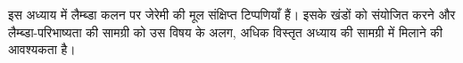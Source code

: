 \documentclass[../../../include/open-logic-chapter]{subfiles}
\begin{document}

\begin{editorial}
इस अध्याय में लैम्ब्डा कलन पर जेरेमी की मूल संक्षिप्त टिप्पणियाँ हैं। इसके
खंडों को संयोजित करने और लैम्ब्डा-परिभाष्यता की सामग्री को उस विषय के अलग,
अधिक विस्तृत अध्याय की सामग्री में मिलाने की आवश्यकता है।
\end{editorial}














\OLEndChapterHook
\end{document}
